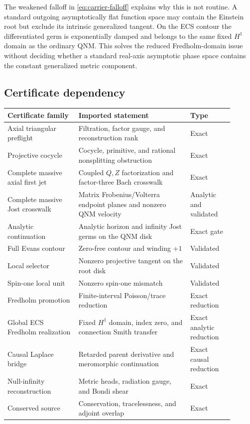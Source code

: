 \documentclass[11pt]{article}
\theoremstyle{remark}
\begin{document}
The weakened falloff in \eqref{eq:carrier-falloff} explains why this is
not routine.  A standard outgoing asymptotically flat function space may
contain the Einstein root but exclude its intrinsic generalized tangent.
On the ECS contour the differentiated germ is exponentially damped and
belongs to the same fixed \(H^1\) domain as the ordinary QNM.  This solves
the reduced Fredholm-domain issue without deciding whether a standard
real-axis asymptotic phase space contains the constant generalized metric
component.

\subsection{Certificate dependency}

\begin{center}
\footnotesize
\begin{tabular}{p{0.29\linewidth}p{0.44\linewidth}p{0.17\linewidth}}
\toprule
Certificate family & Imported statement & Type\\
\midrule
Axial triangular preflight
& Filtration, factor gauge, and reconstruction rank
& Exact\\
Projective cocycle
& Cocycle, primitive, and rational nonsplitting obstruction
& Exact\\
Complete massive axial first jet
& Coupled \(Q,Z\) factorization and factor-three Bach crosswalk
& Exact\\
Complete massive Jost crosswalk
& Matrix Frobenius/Volterra endpoint planes and nonzero QNM velocity
& Analytic and validated\\
Analytic continuation
& Analytic horizon and infinity Jost germs on the QNM disk
& Exact gate\\
Full Evans contour
& Zero-free contour and winding \(+1\)
& Validated\\
Local selector
& Nonzero projective tangent on the root disk
& Validated\\
Spin-one local unit
& Nonzero spin-one mismatch
& Validated\\
Fredholm promotion
& Finite-interval Poisson/trace reduction
& Exact reduction\\
Global ECS Fredholm realization
& Fixed \(H^1\) domain, index zero, and connection Smith transfer
& Exact analytic reduction\\
Causal Laplace bridge
& Retarded parent derivative and meromorphic continuation
& Exact causal reduction\\
Null-infinity reconstruction
& Metric heads, radiation gauge, and Bondi shear
& Exact\\
Conserved source
& Conservation, tracelessness, and adjoint overlap
& Exact\\
\bottomrule
\end{tabular}
\end{center}
\end{document}
